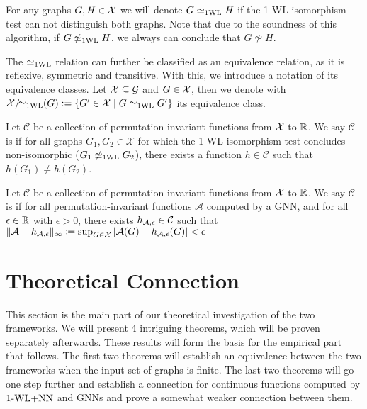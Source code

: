 \begin{definition}[1-WL Relation]
    For any graphs $G,H \in \mathcal{X}$ we will denote $G \simeq_{\text{1WL}} H$ if the 1-WL isomorphism test can not distinguish both graphs. Note that due to the soundness of this algorithm, if $G \not\simeq_{\text{1WL}} H$, we always can conclude that $G \not\simeq H$.
\end{definition}

The $\simeq_{\text{1WL}}$ relation can further be classified as an equivalence relation, as it is reflexive, symmetric and transitive. With this, we introduce a notation of its equivalence classes. Let $\mathcal{X} \subseteq \mathcal{G}$ and $G \in \mathcal{X}$, then we denote with $\mathcal{X}/\!{\simeq_{\text{1WL}}}(G): = \{ G' \in \mathcal{X} \mid G \simeq_{\text{1WL}} G' \}$ its equivalence class.

\begin{definition}[$\wldisc$]
    Let $\mathcal{C}$ be a collection of permutation invariant functions from $\mathcal{X}$ to $\mathbb{R}$. We say $\mathcal{C}$ is \textbf{\wldisc} if for all graphs $G_1, G_2 \in \mathcal{X}$ for which the 1-WL isomorphism test concludes non-isomorphic ($G_1 \not\simeq_{\text{1WL}} G_2$), there exists a function $h \in \mathcal{C}$ such that $h(G_1) \neq h(G_2)$.
\end{definition}

\begin{definition}[$\gapp$]
    Let $\mathcal{C}$ be a collection of permutation invariant functions from $\mathcal{X}$ to $\mathbb{R}$. We say $\mathcal{C}$ is \textbf{\gapp} if for all permutation-invariant functions $\mathcal{A}$ computed by a GNN, and for all $\epsilon \in \mathbb{R}$ with $\epsilon > 0$, there exists $h_{\mathcal{A},\epsilon} \in \mathcal{C}$ such that $\| \mathcal{A} - h_{\mathcal{A},\epsilon} \|_\infty \coloneqq \sup_{G \in \mathcal{X}} |\mathcal{A}(G) - h_{\mathcal{A},\epsilon}(G)| < \epsilon$
\end{definition}

\section{Theoretical Connection}
This section is the main part of our theoretical investigation of the two frameworks. We will present 4 intriguing theorems, which will be proven separately afterwards. These results will form the basis for the empirical part that follows. The first two theorems will establish an equivalence between the two frameworks when the input set of graphs is finite. The last two theorems will go one step further and establish a connection for continuous functions computed by $\text{1-WL+NN}$ and GNNs and prove a somewhat weaker connection between them.

